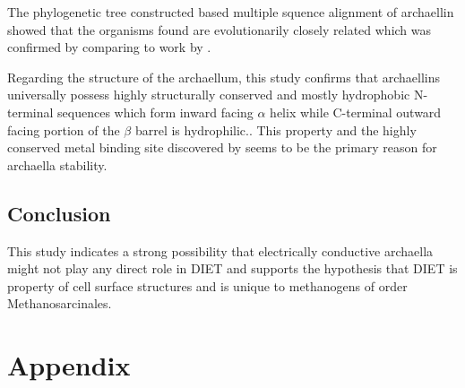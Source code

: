 \documentclass[fontsize=12pt,headsepline=true, bibliography=totocnumbered, twoside]{scrbook} %
\begin{document}
The phylogenetic tree constructed based multiple squence alignment of archaellin showed that the organisms found are evolutionarily closely related which was confirmed by comparing to work by \citet{adam2017growing}.

\vspace{0.5cm}

Regarding the structure of the archaellum, this study confirms that archaellins universally possess highly structurally conserved and mostly hydrophobic N-terminal sequences which form inward facing $\alpha$ helix while C-terminal outward facing portion of the $ \beta$ barrel is hydrophilic.\citep{meshcheryakov2019high, daum2017structure, poweleit2016cryoem}. This property and the highly conserved metal binding site discovered by \citet{meshcheryakov2019high} seems to be the primary reason for archaella stability.


\vspace{2cm}
\section{Conclusion}

This study indicates a strong possibility that electrically conductive archaella might not play any direct role in DIET and supports the hypothesis that DIET  is property of cell surface structures and is unique to methanogens of order Methanosarcinales.











\chapter{Appendix}\label{appendix}
\end{document}
